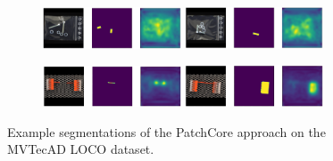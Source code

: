 \begin{figure}[H]
\begin{subfigure}[b]{\textwidth}
    \end{subfigure}
    \begin{subfigure}[b]{\textwidth}
        \centering
        \includegraphics[width=0.45\textwidth]{figures/appendix/appendix_patchcore/SB/screw_bag_test_logical_anomalies_001.png}
        \hfill
        \includegraphics[width=0.45\textwidth]{figures/appendix/appendix_patchcore/SB/screw_bag_test_logical_anomalies_097.png}

    \end{subfigure}
    \begin{subfigure}[b]{\textwidth}
        \centering
        \includegraphics[width=0.45\textwidth]{figures/appendix/appendix_patchcore/SC/splicing_connectors_test_logical_anomalies_003.png}
        \hfill
        \includegraphics[width=0.45\textwidth]{figures/appendix/appendix_patchcore/SC/splicing_connectors_test_structural_anomalies_058.png}

    \end{subfigure}
    
    \caption{Example segmentations of the PatchCore \cite{patchCore2022} approach on the MVTecAD LOCO \cite{LOCODentsAndScratchesBergmann2022} dataset.}
    \label{fig:appendixpatchcore}
\end{figure}
